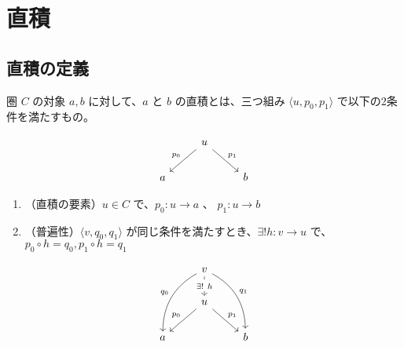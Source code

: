 \documentclass[uplatex,a4j,12pt,dvipdfmx]{jsarticle}
\begin{document}
\section{直積}

\subsection{直積の定義}

圏 $C$ の対象 $a,b$ に対して、$a$ と $b$ の直積とは、三つ組み $\langle u,p_{0},p_{1} \rangle$ で以下の2条件を満たすもの。

\[
	\begin{tikzcd}
		& u \arrow[ld, "p_{0}"'] \arrow[rd, "p_{1}"] &   \\
		a &                                            & b
	\end{tikzcd}
\]

\begin{enumerate}
	\item （直積の要素）$u \in C$ で、$p_{0} : u \to a$ 、 $p_{1} : u \to b$
	\item （普遍性）$\langle v,q_{0},q_{1} \rangle$ が同じ条件を満たすとき、$\exists ! h: v \to u$ で、
	      $p_{0} \circ h = q_{0}, p_{1} \circ h = q_{1}$
\end{enumerate}

\[
	\begin{tikzcd}
		& v \arrow[ldd, "q_{0}"', bend right] \arrow[rdd, "q_{1}", bend left] \arrow[d, "\exists ! \ h" description, dashed] &   \\
		& u \arrow[ld, "p_{0}"'] \arrow[rd, "p_{1}"]                                                                         &   \\
		a &                                                                                                                    & b
	\end{tikzcd}
\]
\end{document}
